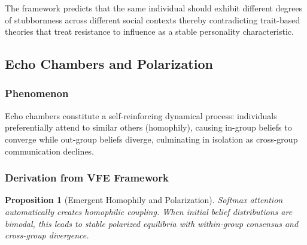\documentclass[12pt]{article}
\newtheorem{proposition}[theorem]{Proposition}
\begin{document}
The framework predicts that the same individual should exhibit different degrees of stubbornness across different social contexts thereby contradicting trait-based theories that treat resistance to influence as a stable personality characteristic.

\subsection{Echo Chambers and Polarization}

\subsubsection{Phenomenon}

Echo chambers constitute a self-reinforcing dynamical process: individuals 
preferentially attend to similar others (homophily), causing in-group beliefs 
to converge while out-group beliefs diverge, culminating in isolation as 
cross-group communication declines.

\subsubsection{Derivation from VFE Framework}

\begin{proposition}[Emergent Homophily and Polarization]
Softmax attention automatically creates homophilic coupling. When initial belief 
distributions are bimodal, this leads to stable polarized equilibria with 
within-group consensus and cross-group divergence.
\end{proposition}
\end{document}
